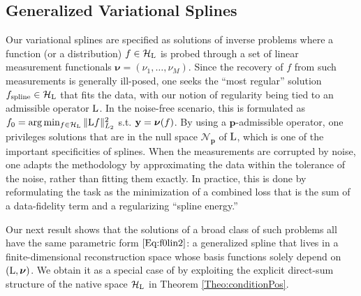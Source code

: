 \documentclass[11pt, english,english]{article}
\newcommand{\R}{ \mathbb{R}}
\newcommand{\Lop}{{\rm L}}
\def\V#1{{\boldsymbol{#1}}}         %
\def\Spc#1{{\mathcal{#1}}}  %
\def\M#1{{\bf{#1}}}  %
\renewcommand{\[}{\begin{equation}}
\renewcommand{\]}[1]{\label{eq:#1}\end{equation}}
\begin{document}
\subsection{Generalized Variational Splines}
Our variational splines are specified as solutions of inverse problems where a function (or a distribution) $f \in \Spc H_\Lop$ 
is probed through a set of linear measurement functionals $\V \nu=(\nu_1, \dots,\nu_M)$.
Since the recovery of $f$ from such measurements is generally ill-posed, one seeks the ``most regular'' solution $f_{\rm spline}\in \Spc H_\Lop$ that fits the data, with our notion of %
regularity being tied to an admissible operator $\Lop$.
In the noise-free scenario, this is formulated as $f_{0}=\arg \min_{f \in \Spc H_\Lop} \|\Lop f\|^2_{L_2}$ s.t. $\M y=\V \nu(f)$.
By using a $\V p$-admissible operator, one privileges solutions that are in the null space $\Spc N_{\V p}$ of $\Lop$, which is one of the important specificities of splines.
When the measurements are corrupted by noise, one adapts the methodology by approximating the data within the tolerance of the noise, rather than fitting them exactly. In practice, this is done by reformulating the task as the minimization of a combined loss that is the sum of a data-fidelity term %
and a regularizing ``spline energy.'' %

Our next result shows that the solutions of a broad class of such problems all have the same parametric form $\eqref{Eq:f0lin2}$: a generalized spline that lives in a finite-dimensional reconstruction space whose basis functions
solely depend on $(\Lop, \V \nu)$.
We obtain it as a special case of \cite[Theorem 3]{Unser2022} by exploiting the explicit direct-sum structure of the native space $\Spc H_\Lop$ in Theorem \ref{Theo:conditionPos}.
\end{document}
